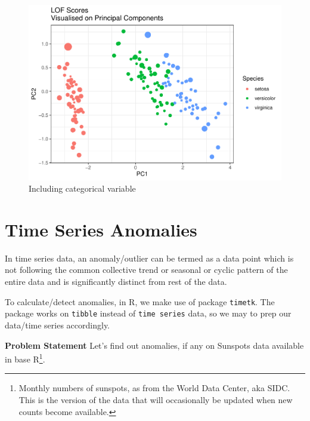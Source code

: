 \documentclass[
]{book}
\begin{document}
\begin{figure}

{\centering \includegraphics[width=0.9\linewidth]{DauR_files/figure-latex/an20-1} 

}

\caption{Including categorical variable}\label{fig:an20}
\end{figure}

\hypertarget{time-series-anomalies}{%
\section{Time Series Anomalies}\label{time-series-anomalies}}

In time series data, an anomaly/outlier can be termed as a data point which is not following the common collective trend or seasonal or cyclic pattern of the entire data and is significantly distinct from rest of the data.

To calculate/detect anomalies, in R, we make use of package \texttt{timetk}. The package works on \texttt{tibble} instead of \texttt{time\ series} data, so we may to prep our data/time series accordingly.

\textbf{Problem Statement} Let's find out anomalies, if any on Sunspots data available in base R\footnote{Monthly numbers of sunspots, as from the World Data Center, aka SIDC. This is the version of the data that will occasionally be updated when new counts become available.}.
\end{document}
